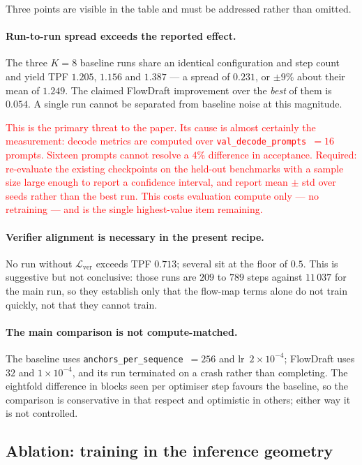 \documentclass{zapiski}
\newcommand{\cm}[1]{\textcolor{red}{#1}}
\begin{document}
Three points are visible in the table and must be addressed rather than
omitted.

\paragraph{Run-to-run spread exceeds the reported effect.} The three $K=8$
baseline runs share an identical configuration and step count and yield TPF
$1.205$, $1.156$ and $1.387$ --- a spread of $0.231$, or $\pm 9\%$ about their
mean of $1.249$. The claimed FlowDraft improvement over the \emph{best} of them
is $0.054$. A single run cannot be separated from baseline noise at this
magnitude.

\cm{This is the primary threat to the paper. Its cause is almost certainly the
measurement: decode metrics are computed over
\texttt{val\_decode\_prompts}~$=16$ prompts. Sixteen prompts cannot resolve a
$4\%$ difference in acceptance. Required: re-evaluate the existing checkpoints
on the held-out benchmarks with a sample size large enough to report a
confidence interval, and report mean $\pm$ std over seeds rather than the best
run. This costs evaluation compute only --- no retraining --- and is the single
highest-value item remaining.}

\paragraph{Verifier alignment is necessary in the present recipe.} No run
without $\mathcal{L}_{\mathrm{ver}}$ exceeds TPF $0.713$; several sit at the
floor of $0.5$. This is suggestive but not conclusive: those runs are $209$ to
$789$ steps against $11\,037$ for the main run, so they establish only that the
flow-map terms alone do not train quickly, not that they cannot train.

\paragraph{The main comparison is not compute-matched.} The baseline uses
\texttt{anchors\_per\_sequence}~$=256$ and lr~$2\!\times\!10^{-4}$; FlowDraft
uses $32$ and $1\!\times\!10^{-4}$, and its run terminated on a crash rather
than completing. The eightfold difference in blocks seen per optimiser step
favours the baseline, so the comparison is conservative in that respect and
optimistic in others; either way it is not controlled.

\subsection{Ablation: training in the inference geometry}
\label{sec:ablation-geometry}
\end{document}
